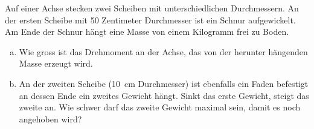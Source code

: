 
\begin{aufgabe}
	Auf einer Achse stecken zwei Scheiben mit unterschiedlichen Durchmessern.
	An der ersten Scheibe mit 50 Zentimeter Durchmesser ist ein Schnur aufgewickelt.
	Am Ende der Schnur hängt eine Masse von einem Kilogramm frei zu Boden.

	\begin{enumerate} [a)]
		\item Wie gross ist das Drehmoment an der Achse, das von der herunter hängenden Masse erzeugt wird.
		\item An der zweiten Scheibe (\SI{10}{cm} Durchmesser) ist ebenfalls ein Faden befestigt an dessen Ende ein zweites Gewicht hängt.
			Sinkt das erste Gewicht, steigt das zweite an. Wie schwer darf das zweite Gewicht maximal sein, damit es noch angehoben wird?
	\end{enumerate}

\end{aufgabe}
